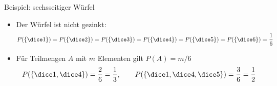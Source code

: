 \begin{frame}{Beispiel: sechsseitiger Würfel}
  \begin{itemize}
  \item Der Würfel ist nicht gezinkt:
    \begin{gather*}
      P(\{\dice1\}) = P(\{\dice2\}) = P(\{\dice3\}) = P(\{\dice4\}) = P(\{\dice5\}) = P(\{\dice6\}) = \frac16
    \end{gather*}
  \item Für Teilmengen $A$ mit $m$ Elementen gilt $P(A)=m/6$
    \begin{gather*}
      P(\{\dice1,\dice4\}) = \frac26=\frac13,
      \qquad
      P(\{\dice1,\dice4,\dice5\}) = \frac36=\frac12
    \end{gather*}
  \end{itemize}
\end{frame}

